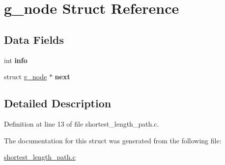 \hypertarget{structg__node}{}\section{g\+\_\+node Struct Reference}
\label{structg__node}
\subsection*{Data Fields}
\begin{DoxyCompactItemize}
\item 
\mbox{\label{structg__node_a29045c997670516117cd2d1cac1069ed}} 
int {\bfseries info}
\item 
\mbox{\label{structg__node_a4362605d8cd96bba951a26d481b89839}} 
struct \mbox{\hyperlink{structg__node}{g\+\_\+node}} $\ast$ {\bfseries next}
\end{DoxyCompactItemize}


\subsection{Detailed Description}


Definition at line 13 of file shortest\+\_\+length\+\_\+path.\+c.



The documentation for this struct was generated from the following file\+:\begin{DoxyCompactItemize}
\item 
\mbox{\hyperlink{shortest__length__path_8c}{shortest\+\_\+length\+\_\+path.\+c}}\end{DoxyCompactItemize}

